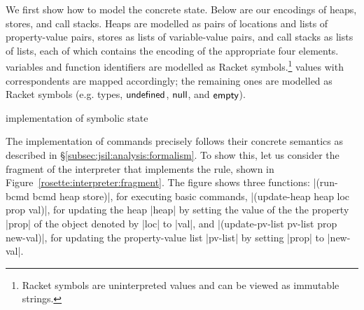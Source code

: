 We first show
how to model the concrete \jsil state. Below are our \rosette encodings of \jsil heaps, stores, 
and call stacks. 
Heaps are modelled as pairs of locations and lists of property-value pairs, 
stores as lists of variable-value pairs, and call stacks as lists of lists, each of which
contains the \rosette encoding of the appropriate four elements. 
\jsil variables and function identifiers are modelled 
as Racket symbols.\footnote{Racket symbols are uninterpreted values and can be viewed as immutable strings.} 
\jsil values with \rosette correspondents are mapped accordingly; the remaining 
ones are modelled as Racket symbols (e.g. \jsil types, ${{\sf undefined}}$, ${\sf null}$, and ${\sf empty}$). 

\begin{display}{\rosette implementation of \jsil symbolic state}
{\scriptsize
{}}
\end{display}

The implementation of \jsil commands precisely follows their concrete semantics as 
described in \S\ref{subsec:jsil:analysis:formalism}. 
To show this, let us consider the fragment of the \jsil interpreter that implements 
the  rule, shown in Figure~\ref{rosette:interpreter:fragment}.
The figure shows three functions:  \schemeinline|(run-bcmd bcmd heap store)|, for 
executing basic commands,  \schemeinline|(update-heap heap loc prop val)|, for 
updating the heap \schemeinline|heap| by setting the value of the 
the property \schemeinline|prop| of the object denoted by \schemeinline|loc| to \schemeinline|val|, 
and  \schemeinline|(update-pv-list pv-list prop new-val)|,
for updating the property-value list \schemeinline|pv-list| by setting \schemeinline|prop|
to \schemeinline|new-val|. 

